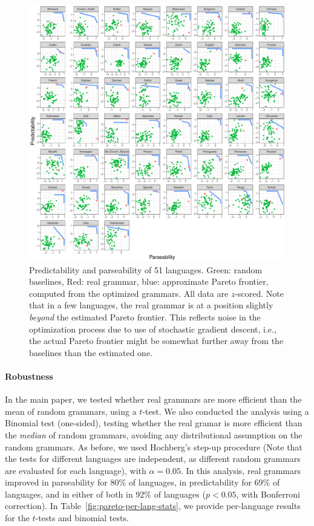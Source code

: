\documentclass[10pt,twoside,lineno]{article}
\begin{document}
\begin{figure}
\centering
\includegraphics[width=\textwidth]{../results/plane/pareto-plane-perLanguage.pdf}
\caption{Predictability and parseability of 51 languages. Green: random baselines, Red: real grammar, blue: approximate Pareto frontier, computed from the optimized grammars. All data are $z$-scored. Note that in a few languages, the real grammar is at a position slightly \emph{beyond} the estimated Pareto frontier. This reflects noise in the optimization process due to use of stochastic gradient descent, i.e., the actual Pareto frontier might be somewhat further away from the baselines than the estimated one.}\label{fig:pareto-per-lang}
\end{figure}



\paragraph{Robustness}
In the main paper, we tested whether real grammars are more efficient than the mean of random grammars, using a $t$-test.
We also conducted the analysis using a Binomial test (one-sided), testing whether the real gramar is more efficient than the \emph{median} of random grammars, avoiding any distributional assumption on the random grammars.
As before, we used Hochberg's step-up procedure (Note that the tests for different languages are independent, as different random grammars are evaluated for each language), with $\alpha=0.05$.
In this analysis, real grammars improved in parseability for 80\% of languages, in predictability for 69\% of languages, and in either of both in 92\% of languages ($p<0.05$, with Bonferroni correction).
In Table~\ref{fig:pareto-per-lang-stats}, we provide per-language results for the $t$-tests and binomial tests.
\end{document}

